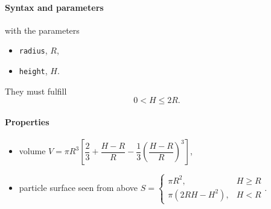 \begin{figure}[h]
\hfill
{}
\hfill
{}
\hfill
\end{figure}
\FloatBarrier

\paragraph{Syntax and parameters}
\begin{quote}
\end{quote}
with the parameters
\begin{itemize}
\item \texttt{radius}, $R$,
\item \texttt{height}, $H$.
\end{itemize}
They must fulfill
\begin{displaymath}
   0 < H\leq 2R.
\end{displaymath}

\paragraph{Properties}
\begin{itemize}
\item volume $V=\pi R^3 \left[\dfrac{2}{3} + \dfrac{H-R}{R} - \dfrac{1}{3}\left(\dfrac{H-R}{R}\right)^3\right]$,
\item particle surface seen from above $S = \left\{\begin{array}{ll} \pi R^2, & H \geq R \\
         \pi\left(2RH-H^2\right), & H < R \end{array}\right. $.
\end{itemize}

